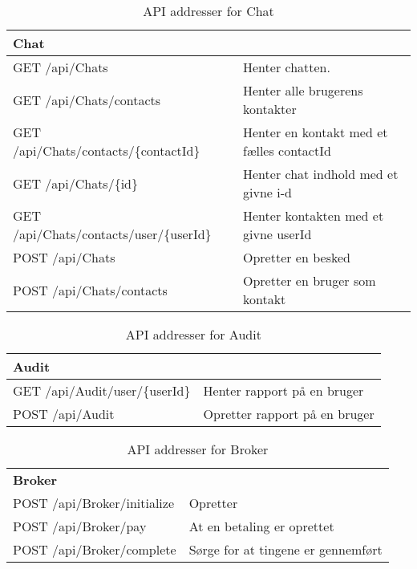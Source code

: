 \begin{table}[H]
	\centering
	\caption{API addresser for Chat}
	\label{tab:web_user}
	\begin{tabular}{p{5cm}|p{11cm}}
		\hline
		\multicolumn{2}{l}{\textbf{Chat}}\\
		\hline
		GET \newline
		/api/Chats &
		 Henter chatten.\\
		\hline
		GET \newline
		/api/Chats/contacts &
		Henter alle brugerens kontakter\\
		\hline
		GET \newline
		/api/Chats/contacts/\{contactId\} &
		Henter en kontakt med et fælles contactId\\
		\hline
		GET \newline
		/api/Chats/\{id\} &
		Henter chat indhold med et givne i-d \\
		\hline
		GET \newline
		/api/Chats/contacts/user/\{userId\} &
		Henter kontakten med et givne userId\\
		\hline
		POST \newline
		/api/Chats &
		Opretter en besked \\
		\hline
		POST \newline
		/api/Chats/contacts &
		Opretter en bruger som kontakt\\
		\hline
	
	\end{tabular}
\end{table}


\begin{table}[H]
	\centering
	\caption{API addresser for Audit}
	\label{tab:web_user}
	\begin{tabular}{p{5cm}|p{11cm}}
		\hline
		\multicolumn{2}{l}{\textbf{Audit}}\\
		\hline
		GET \newline
		/api/Audit/user/\{userId\} & Henter  rapport på en bruger\\
		\hline
		POST \newline
		/api/Audit &
		Opretter rapport på en bruger\\
		\hline
	
	\end{tabular}
\end{table}

\begin{table}[H]
	\centering
	\caption{API addresser for Broker}
	\label{tab:web_user}
	\begin{tabular}{p{5cm}|p{11cm}}
		\hline
		\multicolumn{2}{l}{\textbf{Broker}}\\
		POST \newline
		/api/Broker/initialize &
		Opretter  \\
		\hline
		POST \newline
		/api/Broker/pay &
		At en betaling er oprettet\\
		\hline
		POST \newline
		/api/Broker/complete &
		Sørge for at tingene er gennemført\\
		\hline
	
	\end{tabular}
\end{table}
